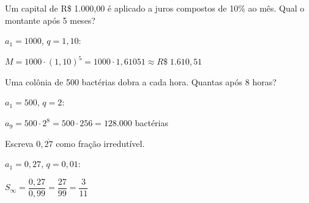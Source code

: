 \documentclass[12pt]{article}
\begin{document}
\begin{multicols}{2}
Um capital de R\$ 1.000,00 é aplicado a juros compostos de 10\% ao mês.
Qual o montante após 5 meses?

$a_1 = 1000$, $q = 1{,}10$:

$M = 1000 \cdot (1{,}10)^5 = 1000 \cdot 1{,}61051 \approx \boxed{R\$\; 1.610{,}51}$


Uma colônia de 500 bactérias dobra a cada hora. Quantas após 8 horas?

$a_1 = 500$, $q = 2$:

$a_9 = 500 \cdot 2^8 = 500 \cdot 256 = \boxed{128.000}$ bactérias


Escreva $0{,}\overline{27}$ como fração irredutível.

$a_1 = 0{,}27$, $q = 0{,}01$:

$S_\infty = \dfrac{0{,}27}{0{,}99} = \dfrac{27}{99} = \boxed{\dfrac{3}{11}}$

\end{multicols}


\end{document}
